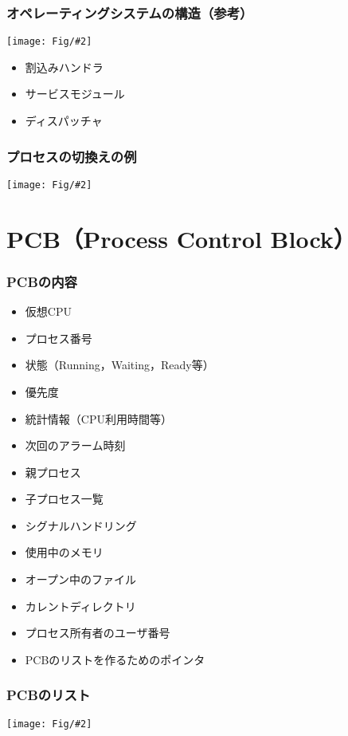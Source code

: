 \documentclass[dvipdfmx]{beamer}
\newcommand{\fig}[2]{\begin{center}\texttt{[image: Fig/\#2]}\end{center}}
\begin{document}
\begin{frame}
  \frametitle{オペレーティングシステムの構造（参考）}
  \fig{scale=0.4}{osOrganization-crop.pdf}
  \begin{itemize}
    \item 割込みハンドラ
    \item サービスモジュール
    \item ディスパッチャ
  \end{itemize}
\end{frame}

\begin{frame}
  \frametitle{プロセスの切換えの例}
  \fig{scale=0.35}{procSwitchInst-crop.pdf}
\end{frame}

\section{PCB（Process Control Block）}
\begin{frame}
  \frametitle{PCBの内容}
\begin{itemize}
\item 仮想CPU
\item プロセス番号
\item 状態（Running，Waiting，Ready等）
\item 優先度
\item 統計情報（CPU利用時間等）
\item 次回のアラーム時刻
\item 親プロセス
\item 子プロセス一覧
\item シグナルハンドリング
\item 使用中のメモリ
\item オープン中のファイル
\item カレントディレクトリ
\item プロセス所有者のユーザ番号
\item PCBのリストを作るためのポインタ
\end{itemize}
\end{frame}

\begin{frame}
  \frametitle{PCBのリスト}
  \fig{scale=0.4}{procQueue-crop.pdf}
\end{frame}
\end{document}
